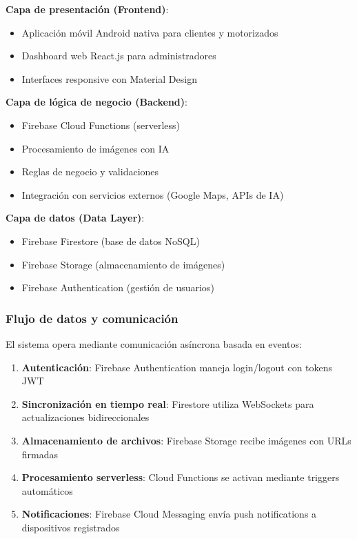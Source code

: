\textbf{Capa de presentación (Frontend)}:
\begin{itemize}
    \item Aplicación móvil Android nativa para clientes y motorizados
    \item Dashboard web React.js para administradores
    \item Interfaces responsive con Material Design
\end{itemize}

\textbf{Capa de lógica de negocio (Backend)}:
\begin{itemize}
    \item Firebase Cloud Functions (serverless)
    \item Procesamiento de imágenes con IA
    \item Reglas de negocio y validaciones
    \item Integración con servicios externos (Google Maps, APIs de IA)
\end{itemize}

\textbf{Capa de datos (Data Layer)}:
\begin{itemize}
    \item Firebase Firestore (base de datos NoSQL)
    \item Firebase Storage (almacenamiento de imágenes)
    \item Firebase Authentication (gestión de usuarios)
\end{itemize}

\subsubsection{Flujo de datos y comunicación}

El sistema opera mediante comunicación asíncrona basada en eventos:

\begin{enumerate}
    \item \textbf{Autenticación}: Firebase Authentication maneja login/logout con tokens JWT
    \item \textbf{Sincronización en tiempo real}: Firestore utiliza WebSockets para actualizaciones bidireccionales
    \item \textbf{Almacenamiento de archivos}: Firebase Storage recibe imágenes con URLs firmadas
    \item \textbf{Procesamiento serverless}: Cloud Functions se activan mediante triggers automáticos
    \item \textbf{Notificaciones}: Firebase Cloud Messaging envía push notifications a dispositivos registrados
\end{enumerate}

